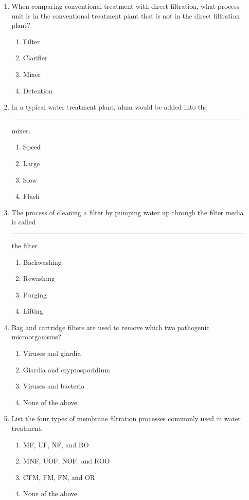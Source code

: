 \documentclass[10pt]{article}
\begin{document}
\begin{enumerate}
\begin{enumerate}
\item When comparing conventional treatment with direct filtration, what process unit is in the conventional treatment plant that is not in the direct filtration plant?
\begin{enumerate}
\item Filter
\item Clarifier
\item Mixer
\item Detention
\end{enumerate}

\item In a typical water treatment plant, alum would be added into the \rule{1cm}{0.5pt}  mixer.
\begin{enumerate}
\item Speed
\item Large
\item Slow
\item Flash
\end{enumerate}

\item The process of cleaning a filter by pumping water up through the filter media is called \rule{1cm}{0.5pt}  the filter.
\begin{enumerate}
\item Backwashing
\item Rewashing
\item Purging
\item Lifting
\end{enumerate}

\item Bag and cartridge filters are used to remove which two pathogenic microorganisms?
\begin{enumerate}
\item Viruses and giardia
\item Giardia and cryptosporidium
\item Viruses and bacteria
\item None of the above
\end{enumerate}

\item List the four types of membrane filtration processes commonly used in water
treatment.
\begin{enumerate}
\item MF, UF, NF, and RO
\item MNF, UOF, NOF, and ROO
\item CFM, FM, FN, and OR
\item None of the above
\end{enumerate}


\end{enumerate}
\end{enumerate}
\end{document}
